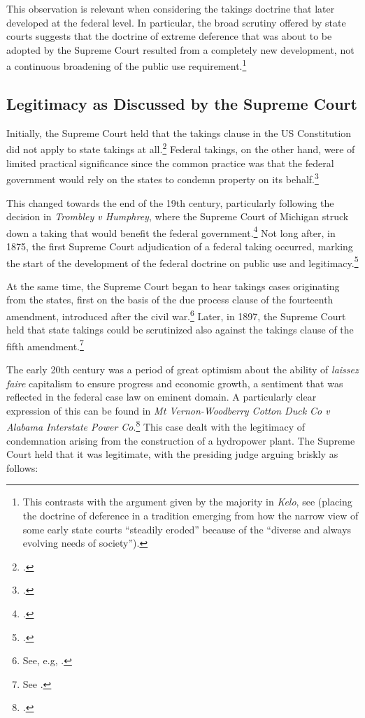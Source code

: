 This observation is relevant when considering the takings doctrine that later developed at the federal level. In particular, the broad scrutiny offered by state courts suggests that the doctrine of extreme deference that was about to be adopted by the Supreme Court resulted from a completely new development, not a continuous broadening of the public use requirement.\footnote{This contrasts with the argument given by the majority in {\it Kelo}, see \cite[479-480]{kelo05} (placing the doctrine of deference in a tradition emerging from how the narrow view of some early state courts ``steadily eroded'' because of the ``diverse and always evolving needs of society'').}

\subsection{Legitimacy as Discussed by the Supreme Court}\label{subsec:US}

Initially, the Supreme Court held that the takings clause in the US Constitution did not apply to state takings at all.\footcite{barron33} Federal takings, on the other hand, were of limited practical significance since the common practice was that the federal government would rely on the states to condemn property on its behalf.\footcite[30]{meidinger80}

This changed towards the end of the 19th century, particularly following the decision in {\it Trombley v Humphrey}, where the Supreme Court of Michigan struck down a taking that would benefit the federal government.\footcite{trombley71} Not long after, in 1875, the first Supreme Court adjudication of a federal taking occurred, marking the start of the development of the federal doctrine on public use and legitimacy.\footcite{kohl75} 

At the same time, the Supreme Court began to hear takings cases originating from the states, first on the basis of the due process clause of the fourteenth amendment, introduced after the civil war.\footnote{See, e.g, \cite{head85}.} Later, in 1897, the Supreme Court held that state takings could be scrutinized also against the takings clause of the fifth amendment.\footnote{See \cite{chicago97}.}

The early 20th century was a period of great optimism about the ability of {\it laissez faire} capitalism to ensure progress and economic growth, a sentiment that was reflected in the federal case law on eminent domain. A particularly clear expression of this can be found in {\it Mt Vernon-Woodberry Cotton Duck Co v Alabama Interstate Power Co}.\footcite{vernon16}  This case dealt with the legitimacy of condemnation arising from the construction of a hydropower plant. The Supreme Court held that it was legitimate, with the presiding judge arguing briskly as follows:

